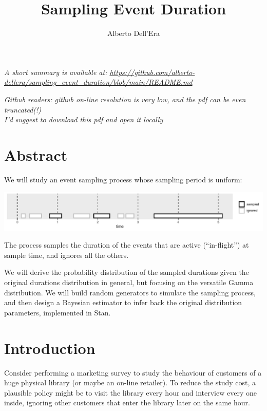 \documentclass[]{article}
\title{Sampling Event Duration}
\author{Alberto Dell'Era}
\date{}
\begin{document}
\maketitle

\emph{A short summary is available at:
\url{https://github.com/alberto-dellera/sampling_event_duration/blob/main/README.md}}

\emph{Github readers: github on-line resolution is very low, and the pdf
can be even truncated(!)\\
I'd suggest to download this pdf and open it locally}

\hypertarget{abstract}{%
\section{Abstract}\label{abstract}}

We will study an event sampling process whose sampling period is
uniform:

\begin{center}\includegraphics[width=1.0\textwidth]{sampling_event_duration_files/figure-latex/abstract_sampling_illustration-1} \end{center}

The process samples the duration of the events that are active
(``in-flight'') at sample time, and ignores all the others.

We will derive the probability distribution of the sampled durations
given the original durations distribution in general, but focusing on
the versatile Gamma distribution. We will build random generators to
simulate the sampling process, and then design a Bayesian estimator to
infer back the original distribution parameters, implemented in Stan.

\hypertarget{introduction}{%
\section{Introduction}\label{introduction}}

Consider performing a marketing survey to study the behaviour of
customers of a huge physical library (or maybe an on-line retailer). To
reduce the study cost, a plausible policy might be to visit the library
every hour and interview every one inside, ignoring other customers that
enter the library later on the same hour.
\end{document}
